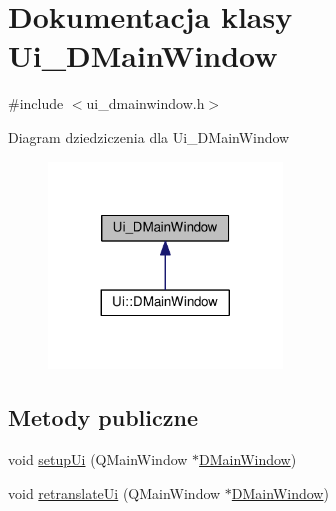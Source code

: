 \hypertarget{class_ui___d_main_window}{\section{Dokumentacja klasy Ui\-\_\-\-D\-Main\-Window}
\label{class_ui___d_main_window}
}


{\ttfamily \#include $<$ui\-\_\-dmainwindow.\-h$>$}



Diagram dziedziczenia dla Ui\-\_\-\-D\-Main\-Window
\nopagebreak
\begin{figure}[H]
\begin{center}
\leavevmode
\includegraphics[width=176pt]{class_ui___d_main_window__inherit__graph}
\end{center}
\end{figure}
\subsection*{Metody publiczne}
\begin{DoxyCompactItemize}
\item 
void \hyperlink{class_ui___d_main_window_aa53f3a89bf520704a3e79037df2fd451}{setup\-Ui} (Q\-Main\-Window $\ast$\hyperlink{class_d_main_window}{D\-Main\-Window})
\item 
void \hyperlink{class_ui___d_main_window_a406169c751ddfd205b89375c7542827c}{retranslate\-Ui} (Q\-Main\-Window $\ast$\hyperlink{class_d_main_window}{D\-Main\-Window})
\end{DoxyCompactItemize}
